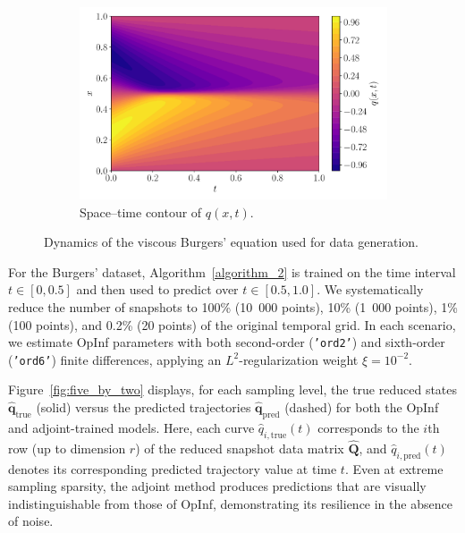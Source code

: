 \begin{figure}[h!]
\begin{subfigure}[t]{0.5\textwidth}
    \includegraphics[width=\textwidth]{figures/heatmap_001.pdf}
    \caption{Space–time contour of \(q(x,t)\).}
    \label{fig:burgers-contour}
  \end{subfigure}
  \caption{Dynamics of the viscous Burgers’ equation used for data generation.}
  \label{fig:burgers-data}
\end{figure}
For the Burgers’ dataset, Algorithm~\ref{algorithm_2} is trained on the time interval $t\in[0,0.5]$ and then used to predict over $t\in[0.5,1.0]$. We systematically reduce the number of snapshots to 100\% (10~000 points), 10\% (1~000 points), 1\% (100 points), and 0.2\% (20 points) of the original temporal grid. In each scenario, we estimate OpInf parameters with both second-order (\texttt{'ord2'}) and sixth-order (\texttt{'ord6'}) finite differences, applying an $L^2$-regularization weight $\xi=10^{-2}$.  

Figure~\ref{fig:five_by_two} displays, for each sampling level, the true reduced states $\hat{\mathbf{q}}_{\mathrm{true}}$ (solid) versus the predicted trajectories $\hat{\mathbf{q}}_{\mathrm{pred}}$ (dashed) for both the OpInf and adjoint-trained models.  Here, each curve $\hat{q}_{i,\mathrm{true}}(t)$ corresponds to the $i$th row (up to dimension $r$) of the reduced snapshot data matrix $\hat{\mathbf{Q}}$, and $\hat{q}_{i,\mathrm{pred}}(t)$ denotes its corresponding predicted trajectory value at time $t$. Even at extreme sampling sparsity, the adjoint method produces predictions that are visually indistinguishable from those of OpInf, demonstrating its resilience in the absence of noise.

\newpage


